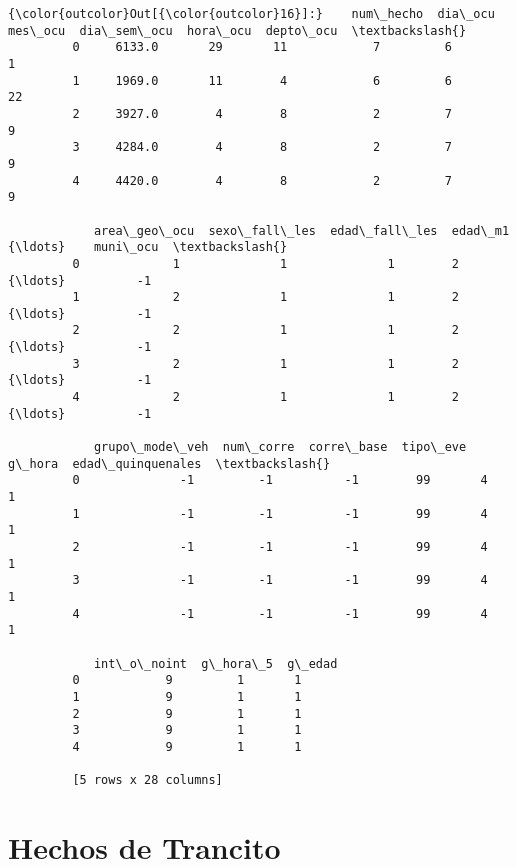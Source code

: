 \documentclass[11pt]{article}
\begin{document}
\begin{Verbatim}[commandchars=\\\{\}]
{\color{outcolor}Out[{\color{outcolor}16}]:}    num\_hecho  dia\_ocu  mes\_ocu  dia\_sem\_ocu  hora\_ocu  depto\_ocu  \textbackslash{}
         0     6133.0       29       11            7         6          1   
         1     1969.0       11        4            6         6         22   
         2     3927.0        4        8            2         7          9   
         3     4284.0        4        8            2         7          9   
         4     4420.0        4        8            2         7          9   
         
            area\_geo\_ocu  sexo\_fall\_les  edad\_fall\_les  edad\_m1   {\ldots}    muni\_ocu  \textbackslash{}
         0             1              1              1        2   {\ldots}          -1   
         1             2              1              1        2   {\ldots}          -1   
         2             2              1              1        2   {\ldots}          -1   
         3             2              1              1        2   {\ldots}          -1   
         4             2              1              1        2   {\ldots}          -1   
         
            grupo\_mode\_veh  num\_corre  corre\_base  tipo\_eve  g\_hora  edad\_quinquenales  \textbackslash{}
         0              -1         -1          -1        99       4                  1   
         1              -1         -1          -1        99       4                  1   
         2              -1         -1          -1        99       4                  1   
         3              -1         -1          -1        99       4                  1   
         4              -1         -1          -1        99       4                  1   
         
            int\_o\_noint  g\_hora\_5  g\_edad  
         0            9         1       1  
         1            9         1       1  
         2            9         1       1  
         3            9         1       1  
         4            9         1       1  
         
         [5 rows x 28 columns]
\end{Verbatim}
            
    \hypertarget{hechos-de-trancito}{%
\section{Hechos de Trancito}\label{hechos-de-trancito}}
\end{document}
